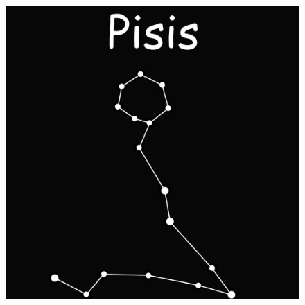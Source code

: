 \documentclass[10pt,a4paper]{article}
\begin{document}
\begin{itemize}
  \begin{figure}[H]
\centering
\includegraphics[scale=0.18]{Imagenes/Pisis_01}
\end{figure}
\end{itemize}
\end{document}
